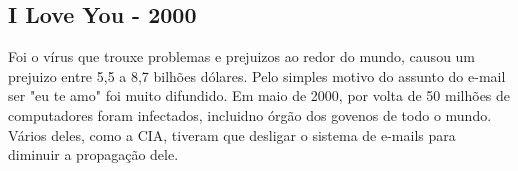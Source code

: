 \subsection{I Love You - 2000}	
	Foi o vírus que trouxe problemas e prejuizos ao redor do mundo, causou um prejuizo entre 5,5 a 8,7 bilhões dólares.  Pelo simples motivo do assunto do e-mail ser "eu te amo" foi muito difundido. Em maio de 2000, por volta de 50 milhões de computadores foram infectados, incluidno órgão dos govenos de todo o mundo. Vários deles, como a CIA, tiveram que desligar o sistema de e-mails para diminuir a propagação dele.
